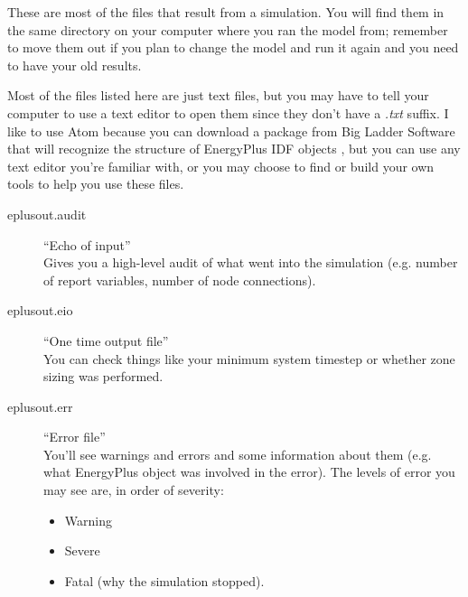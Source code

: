 \documentclass[10pt]{article}
\begin{document}
These are most of the files that result from a simulation. You will find them in the same directory on your computer where you ran the model from; remember to move them out if you plan to change the model and run it again and you need to have your old results. 

Most of the files listed here are just text files, but you may have to tell your computer to use a text editor to open them since they don't have a \textit{.txt} suffix. I like to use Atom because you can download a package from Big Ladder Software that will recognize the structure of EnergyPlus IDF objects  \cite{language-energyplus}, but you can use any text editor you're familiar with, or you may choose to find or build your own tools to help you use these files.

\begin{description}
\item[eplusout.audit] ``Echo of input''\\ Gives you a high-level audit of what went into the simulation (e.g. number of report variables, number of node connections). \cite{EPdocs9inputoutput}
\item[eplusout.eio] ``One time output file'' \cite{EPdocs9inputoutput}\\ You can check things like your minimum system timestep or whether zone sizing was performed. 
\item[eplusout.err] ``Error file''\cite{EPdocs9inputoutput} \\You'll see warnings and errors and some information about them (e.g. what EnergyPlus object was involved in the error). The levels of error you may see are, in order of severity:

\vspace{-6pt}
\begin{itemize}
    \setlength{\itemsep}{0pt}%
    \setlength{\parskip}{0pt}%
    \item Warning
    \item Severe
    \item Fatal (why the simulation stopped).
\end{itemize}
\vspace{-6pt}


\end{description}
\end{document}
